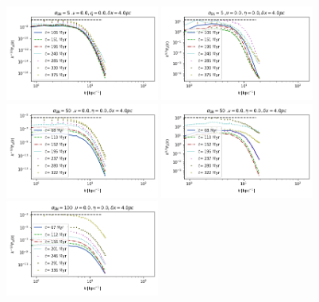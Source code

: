 \documentclass[iop,apj,numberedappendix,twocolappendix]{emulateapj}
\begin{document}
\begin{figure}
\centering
\includegraphics[trim=0.0cm 0.00cm 0.0cm 0.0cm,clip=true,width=0.45\textwidth]{csc_figs/4pc_01SNseedBpower.png}
\includegraphics[trim=0.0cm 0.00cm 0.0cm 0.0cm,clip=true,width=0.45\textwidth]{csc_figs/4pc_01SNseedkpower.png}
\includegraphics[trim=0.0cm 0.00cm 0.0cm 0.0cm,clip=true,width=0.45\textwidth]{csc_figs/4pc_h5seedBpower.png}
\includegraphics[trim=0.0cm 0.00cm 0.0cm 0.0cm,clip=true,width=0.45\textwidth]{csc_figs/4pc_h5seedkpower.png}
\includegraphics[trim=0.0cm 0.00cm 0.0cm 0.0cm,clip=true,width=0.45\textwidth]{csc_figs/4pc_2SNseedBpower.png}

\end{figure}
\end{document}
